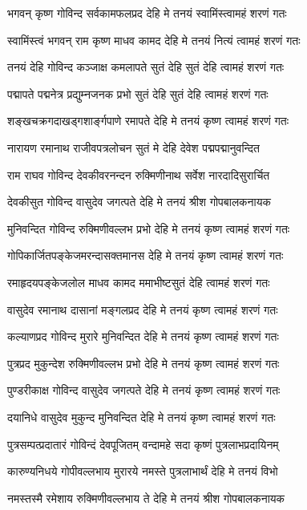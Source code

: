 \twolineshloka
{भगवन् कृष्ण गोविन्द सर्वकामफलप्रद}
{देहि मे तनयं स्वामिंस्त्वामहं शरणं गतः}%

\twolineshloka
{स्वामिंस्त्वं भगवन् राम कृष्ण माधव कामद}
{देहि मे तनयं नित्यं त्वामहं शरणं गतः}%

\twolineshloka
{तनयं देहि गोविन्द कञ्जाक्ष कमलापते}
{सुतं देहि सुतं देहि त्वामहं शरणं गतः}%

\twolineshloka
{पद्मापते पद्मनेत्र प्रद्युम्नजनक प्रभो}
{सुतं देहि सुतं देहि त्वामहं शरणं गतः}%

\twolineshloka
{शङ्खचक्रगदाखड्गशार्ङ्गपाणे रमापते}
{देहि मे तनयं कृष्ण त्वामहं शरणं गतः}%

\twolineshloka
{नारायण रमानाथ राजीवपत्रलोचन}
{सुतं मे देहि देवेश पद्मपद्मानुवन्दित}%

\twolineshloka
{राम राघव गोविन्द देवकीवरनन्दन}
{रुक्मिणीनाथ सर्वेश नारदादिसुरार्चित}%

\twolineshloka
{देवकीसुत गोविन्द वासुदेव जगत्पते}
{देहि मे तनयं श्रीश गोपबालकनायक}%

\twolineshloka
{मुनिवन्दित गोविन्द रुक्मिणीवल्लभ प्रभो}
{देहि मे तनयं कृष्ण त्वामहं शरणं गतः}%

\twolineshloka
{गोपिकार्जितपङ्केजमरन्दासक्तमानस}
{देहि मे तनयं कृष्ण त्वामहं शरणं गतः}%

\twolineshloka
{रमाहृदयपङ्केजलोल माधव कामद}
{ममाभीष्टसुतं देहि त्वामहं शरणं गतः}%

\twolineshloka
{वासुदेव रमानाथ दासानां मङ्गलप्रद}
{देहि मे तनयं कृष्ण त्वामहं शरणं गतः}%

\twolineshloka
{कल्याणप्रद गोविन्द मुरारे मुनिवन्दित}
{देहि मे तनयं कृष्ण त्वामहं शरणं गतः}%

\twolineshloka
{पुत्रप्रद मुकुन्देश रुक्मिणीवल्लभ प्रभो}
{देहि मे तनयं कृष्ण त्वामहं शरणं गतः}%

\twolineshloka
{पुण्डरीकाक्ष गोविन्द वासुदेव जगत्पते}
{देहि मे तनयं कृष्ण त्वामहं शरणं गतः}%

\twolineshloka
{दयानिधे वासुदेव मुकुन्द मुनिवन्दित}
{देहि मे तनयं कृष्ण त्वामहं शरणं गतः}%

\twolineshloka
{पुत्रसम्पत्प्रदातारं गोविन्दं देवपूजितम्}
{वन्दामहे सदा कृष्णं पुत्रलाभप्रदायिनम्}%

\twolineshloka
{कारुण्यनिधये गोपीवल्लभाय मुरारये}
{नमस्ते पुत्रलाभार्थं देहि मे तनयं विभो}%

\twolineshloka
{नमस्तस्मै रमेशाय रुक्मिणीवल्लभाय ते}
{देहि मे तनयं श्रीश गोपबालकनायक}%

